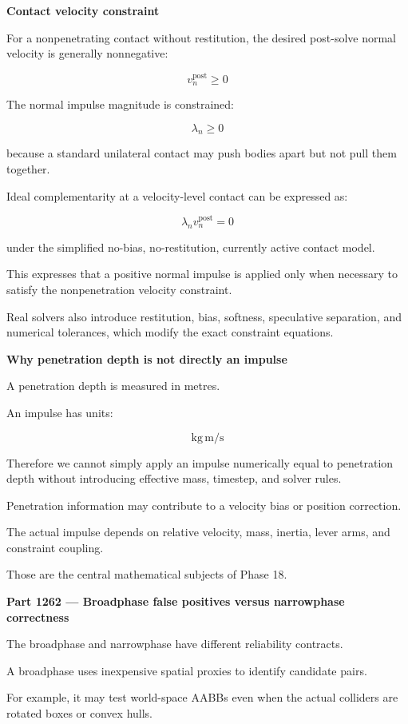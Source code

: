 \textbf{Contact velocity constraint}

For a nonpenetrating contact without restitution, the desired post-solve normal velocity is generally nonnegative:

\[
\boxed{ v_n^{\mathrm{post}}\ge0 }
\]

The normal impulse magnitude is constrained:

\[
\boxed{ \lambda_n\ge0 }
\]

because a standard unilateral contact may push bodies apart but not pull them together.

Ideal complementarity at a velocity-level contact can be expressed as:

\[
\boxed{ \lambda_n v_n^{\mathrm{post}}=0 }
\]

under the simplified no-bias, no-restitution, currently active contact model.

This expresses that a positive normal impulse is applied only when necessary to satisfy the nonpenetration velocity constraint.

Real solvers also introduce restitution, bias, softness, speculative separation, and numerical tolerances, which modify the exact constraint equations.

\textbf{Why penetration depth is not directly an impulse}

A penetration depth is measured in metres.

An impulse has units:

\[
\mathrm{kg\,m/s}
\]

Therefore we cannot simply apply an impulse numerically equal to penetration depth without introducing effective mass, timestep, and solver rules.

Penetration information may contribute to a velocity bias or position correction.

The actual impulse depends on relative velocity, mass, inertia, lever arms, and constraint coupling.

Those are the central mathematical subjects of Phase 18.

\textbf{Part 1262 --- Broadphase false positives versus narrowphase correctness}

The broadphase and narrowphase have different reliability contracts.

A broadphase uses inexpensive spatial proxies to identify candidate pairs.

For example, it may test world-space AABBs even when the actual colliders are rotated boxes or convex hulls.

